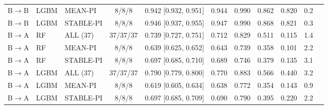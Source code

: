\begin{tabular}{lllcccccccc}
B$\rightarrow$B & LGBM & MEAN-PI & 8/8/8 & 0.942 [0.932, 0.951] & 0.944 & 0.990 & 0.862 & 0.820 & 0.2 \\
B$\rightarrow$B & LGBM & STABLE-PI & 8/8/8 & 0.946 [0.937, 0.955] & 0.947 & 0.990 & 0.868 & 0.821 & 0.3 \\
\midrule
B$\rightarrow$A & RF & ALL (37) & 37/37/37 & 0.739 [0.727, 0.751] & 0.712 & 0.829 & 0.511 & 0.115 & 1.4 \\
B$\rightarrow$A & RF & MEAN-PI & 8/8/8 & 0.639 [0.625, 0.652] & 0.643 & 0.739 & 0.358 & 0.101 & 2.2 \\
B$\rightarrow$A & RF & STABLE-PI & 8/8/8 & 0.697 [0.685, 0.710] & 0.689 & 0.746 & 0.379 & 0.135 & 3.1 \\
B$\rightarrow$A & LGBM & ALL (37) & 37/37/37 & 0.790 [0.779, 0.800] & 0.770 & 0.883 & 0.566 & 0.440 & 3.2 \\
B$\rightarrow$A & LGBM & MEAN-PI & 8/8/8 & 0.619 [0.605, 0.634] & 0.638 & 0.772 & 0.354 & 0.143 & 0.9 \\
B$\rightarrow$A & LGBM & STABLE-PI & 8/8/8 & 0.697 [0.685, 0.709] & 0.690 & 0.790 & 0.395 & 0.220 & 2.2 \\
\bottomrule
\end{tabular}

